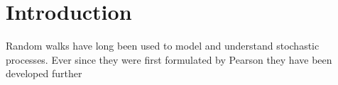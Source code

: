 \chapter{Introduction}

Random walks have long been used to model and understand stochastic processes. Ever since they were first formulated by Pearson \cite{pearson} they have been developed further 








